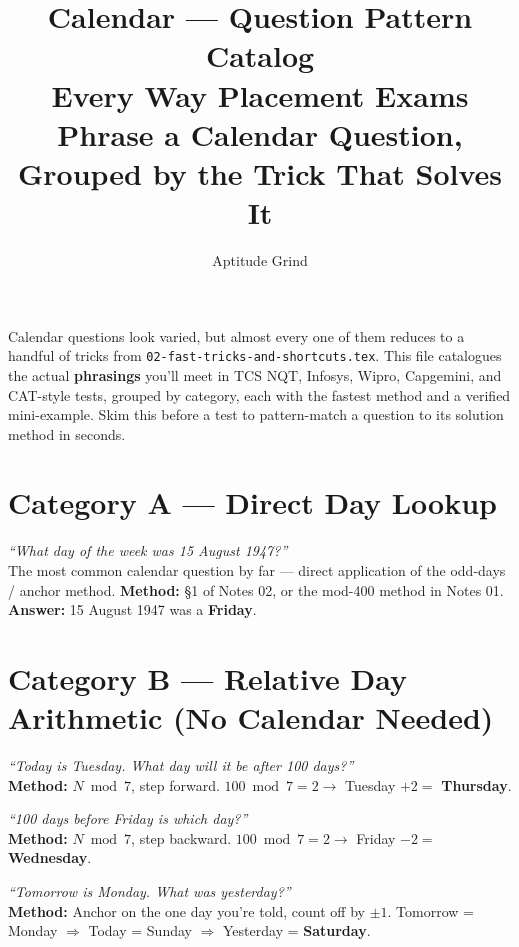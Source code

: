 \documentclass[11pt]{article}
\title{\color{primary}\textbf{Calendar --- Question Pattern Catalog}\\[4pt]\large Every Way Placement Exams Phrase a Calendar Question, Grouped by the Trick That Solves It}
\author{Aptitude Grind}
\date{}
\begin{document}
\maketitle
\thispagestyle{fancy}

Calendar questions look varied, but almost every one of them reduces to a handful of tricks from
\texttt{02-fast-tricks-and-shortcuts.tex}. This file catalogues the actual \textbf{phrasings} you'll
meet in TCS NQT, Infosys, Wipro, Capgemini, and CAT-style tests, grouped by category, each with the
fastest method and a verified mini-example. Skim this before a test to pattern-match a question to
its solution method in seconds.

\section{Category A --- Direct Day Lookup}

\begin{examplebox}
\emph{``What day of the week was 15 August 1947?''} \\
The most common calendar question by far --- direct application of the odd-days / anchor method.
\textbf{Method:} \S1 of Notes 02, or the mod-400 method in Notes 01. \\
\textbf{Answer:} 15 August 1947 was a \textbf{Friday}.
\end{examplebox}

\section{Category B --- Relative Day Arithmetic (No Calendar Needed)}

\begin{examplebox}
\emph{``Today is Tuesday. What day will it be after 100 days?''} \\
\textbf{Method:} $N \bmod 7$, step forward. $100 \bmod 7 = 2 \to$ Tuesday $+2 = $ \textbf{Thursday}.
\end{examplebox}

\begin{examplebox}
\emph{``100 days before Friday is which day?''} \\
\textbf{Method:} $N \bmod 7$, step backward. $100 \bmod 7 = 2 \to$ Friday $-2 = $ \textbf{Wednesday}.
\end{examplebox}

\begin{examplebox}
\emph{``Tomorrow is Monday. What was yesterday?''} \\
\textbf{Method:} Anchor on the one day you're told, count off by $\pm 1$. Tomorrow = Monday
$\Rightarrow$ Today = Sunday $\Rightarrow$ Yesterday = \textbf{Saturday}.
\end{examplebox}
\end{document}
